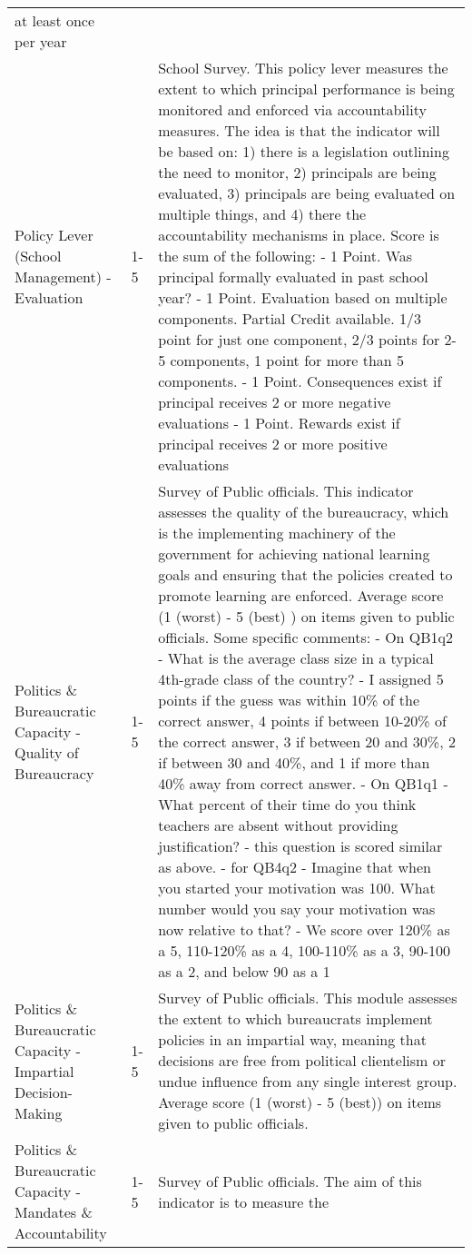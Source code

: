 \documentclass[]{article}
\begin{document}
\begin{longtable}[]{@{}lll@{}}
at least once per year\tabularnewline
Policy Lever (School Management) - Evaluation & 1-5 & School Survey.
This policy lever measures the extent to which principal performance is
being monitored and enforced via accountability measures. The idea is
that the indicator will be based on: 1) there is a legislation outlining
the need to monitor, 2) principals are being evaluated, 3) principals
are being evaluated on multiple things, and 4) there the accountability
mechanisms in place. Score is the sum of the following: - 1 Point. Was
principal formally evaluated in past school year? - 1 Point. Evaluation
based on multiple components. Partial Credit available. 1/3 point for
just one component, 2/3 points for 2-5 components, 1 point for more than
5 components. - 1 Point. Consequences exist if principal receives 2 or
more negative evaluations - 1 Point. Rewards exist if principal receives
2 or more positive evaluations\tabularnewline
Politics \& Bureaucratic Capacity - Quality of Bureaucracy & 1-5 &
Survey of Public officials. This indicator assesses the quality of the
bureaucracy, which is the implementing machinery of the government for
achieving national learning goals and ensuring that the policies created
to promote learning are enforced. Average score (1 (worst) - 5 (best) )
on items given to public officials. Some specific comments: - On QB1q2 -
What is the average class size in a typical 4th-grade class of the
country? - I assigned 5 points if the guess was within 10\% of the
correct answer, 4 points if between 10-20\% of the correct answer, 3 if
between 20 and 30\%, 2 if between 30 and 40\%, and 1 if more than 40\%
away from correct answer. - On QB1q1 - What percent of their time do you
think teachers are absent without providing justification? - this
question is scored similar as above. - for QB4q2 - Imagine that when you
started your motivation was 100. What number would you say your
motivation was now relative to that? - We score over 120\% as a 5,
110-120\% as a 4, 100-110\% as a 3, 90-100 as a 2, and below 90 as a
1\tabularnewline
Politics \& Bureaucratic Capacity - Impartial Decision-Making & 1-5 &
Survey of Public officials. This module assesses the extent to which
bureaucrats implement policies in an impartial way, meaning that
decisions are free from political clientelism or undue influence from
any single interest group. Average score (1 (worst) - 5 (best)) on items
given to public officials.\tabularnewline
Politics \& Bureaucratic Capacity - Mandates \& Accountability & 1-5 &
Survey of Public officials. The aim of this indicator is to measure the

\end{longtable}
\end{document}
